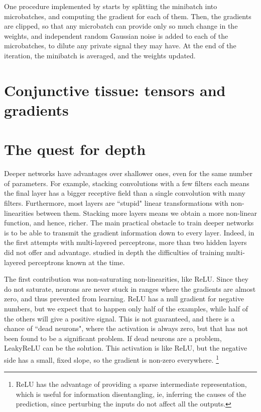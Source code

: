 One procedure implemented by \citet{tf_privacy} starts by splitting the minibatch into microbatches, and computing the gradient for each of them.
Then, the gradients are clipped, so that any microbatch can provide only so much change in the weights, and independent random Gaussian noise is added to each of the microbatches, to dilute any private signal they may have.
At the end of the iteration, the minibatch is averaged, and the weights updated.


\section{Conjunctive tissue: tensors and gradients}


\section{The quest for depth}
Deeper networks have advantages over shallower ones, even for the same number of parameters.
For example, stacking convolutions with a few filters each means the final layer has a bigger receptive field than a single convolution with many filters.
Furthermore, most layers are ``stupid" linear transformations with non-linearities between them.
Stacking more layers means we obtain a more non-linear function, and hence, richer.
The main practical obstacle to train deeper networks is to be able to transmit the gradient information down to every layer.
Indeed, in the first attempts with multi-layered perceptrons, more than two hidden layers did not offer and advantage.
\citet{glorot} studied in depth the difficulties of training multi-layered perceptrons known at the time.

The first contribution  was non-saturating non-linearities, like ReLU.
Since they do not saturate, neurons are never stuck in ranges where the gradients are almost zero, and thus prevented from learning.
ReLU has a null gradient for negative numbers, but we expect that to happen only half of the examples, while half of the others will give a positive signal.
This is not guaranteed, and there is a chance of ``dead neurons", where the activation is always zero, but that has not been found to be a significant problem.
If dead neurons are a problem, LeakyReLU   can be the solution.
This activation is like ReLU, but the negative side has a small, fixed slope, so the gradient is non-zero everywhere.
\footnote{ReLU has the advantage of providing a sparse intermediate representation, which is useful for information disentangling, ie, inferring the causes of the prediction, since perturbing the inputs do not affect all the outputs.}

